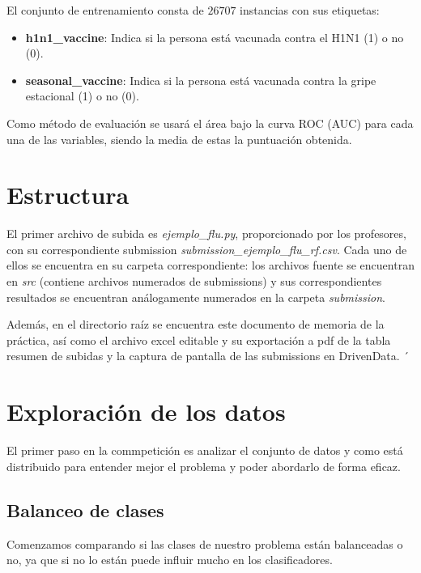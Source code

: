\documentclass[twoside,openright,titlepage,numbers=noenddot,openany,headinclude,footinclude=true,
cleardoublepage=empty,abstractoff,BCOR=5mm,paper=a4,fontsize=12pt,main=spanish]{scrreprt}
\begin{document}
El conjunto de entrenamiento consta de $26707$ instancias con sus etiquetas:

\begin{itemize}
\item \textbf{h1n1\_vaccine}: Indica si la persona está vacunada contra el H1N1 (1) o no (0).
\item \textbf{seasonal\_vaccine}: Indica si la persona está vacunada contra la gripe estacional (1) o no (0).
\end{itemize}

Como método de evaluación se usará el área bajo la curva ROC (AUC) para cada una de las variables, siendo la media de estas la puntuación obtenida.

\newpage
\section{Estructura}
El primer archivo de subida es \textit{ejemplo\_flu.py}, proporcionado por los profesores, con su correspondiente submission \textit{submission\_ejemplo\_flu\_rf.csv}. Cada uno de ellos se encuentra en su carpeta correspondiente: los archivos fuente se encuentran en \textit{src} (contiene archivos numerados de submissions) y sus correspondientes resultados se encuentran análogamente numerados en la carpeta \textit{submission}.

Además, en el directorio raíz se encuentra este documento de memoria de la práctica, así como el archivo excel editable y su exportación a pdf de la tabla resumen de subidas y la captura de pantalla de las submissions en DrivenData.
´
\newpage
\section{Exploración de los datos}

El primer paso en la commpetición es analizar el conjunto de datos y como está distribuido para entender mejor el problema y poder abordarlo de forma eficaz.

\subsection{Balanceo de clases}

Comenzamos comparando si las clases de nuestro problema están balanceadas o no, ya que si no lo están puede influir mucho en los clasificadores.
\end{document}
